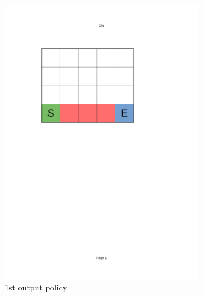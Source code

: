 \begin{figure}[!ht]
    \centering
    \begin{subfigure}{0.24\textwidth}
        \centering
            \includegraphics[page=8, trim = 40mm 160mm 70mm 45mm, clip, width=0.95\textwidth]{figures/personal_work/policies.pdf}
        \caption{1st output policy}
    \end{subfigure}
    \begin{subfigure}{0.24\textwidth}
        \centering

\end{subfigure}
\end{figure}
